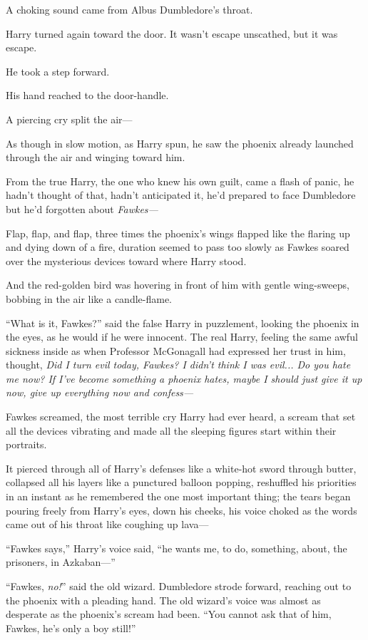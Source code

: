 A choking sound came from Albus Dumbledore’s throat.

Harry turned again toward the door. It wasn’t escape unscathed, but it was escape.

He took a step forward.

His hand reached to the door-handle.

A piercing cry split the air—

As though in slow motion, as Harry spun, he saw the phoenix already launched through the air and winging toward him.

From the true Harry, the one who knew his own guilt, came a flash of panic, he hadn’t thought of that, hadn’t anticipated it, he’d prepared to face Dumbledore but he’d forgotten about \emph{Fawkes—}

Flap, flap, and flap, three times the phoenix’s wings flapped like the flaring up and dying down of a fire, duration seemed to pass too slowly as Fawkes soared over the mysterious devices toward where Harry stood.

And the red-golden bird was hovering in front of him with gentle wing-sweeps, bobbing in the air like a candle-flame.

“What is it, Fawkes?” said the false Harry in puzzlement, looking the phoenix in the eyes, as he would if he were innocent. The real Harry, feeling the same awful sickness inside as when Professor McGonagall had expressed her trust in him, thought, \emph{Did I turn evil today, Fawkes? I didn’t think I was evil... Do you hate me now? If I’ve become something a phoenix hates, maybe I should just give it up now, give up everything now and confess—}

Fawkes screamed, the most terrible cry Harry had ever heard, a scream that set all the devices vibrating and made all the sleeping figures start within their portraits.

It pierced through all of Harry’s defenses like a white-hot sword through butter, collapsed all his layers like a punctured balloon popping, reshuffled his priorities in an instant as he remembered the one most important thing; the tears began pouring freely from Harry’s eyes, down his cheeks, his voice choked as the words came out of his throat like coughing up lava—

“Fawkes says,” Harry’s voice said, “he wants me, to do, something, about, the prisoners, in Azkaban—”

“Fawkes, \emph{no!}” said the old wizard. Dumbledore strode forward, reaching out to the phoenix with a pleading hand. The old wizard’s voice was almost as desperate as the phoenix’s scream had been. “You cannot ask that of him, Fawkes, he’s only a boy still!”

